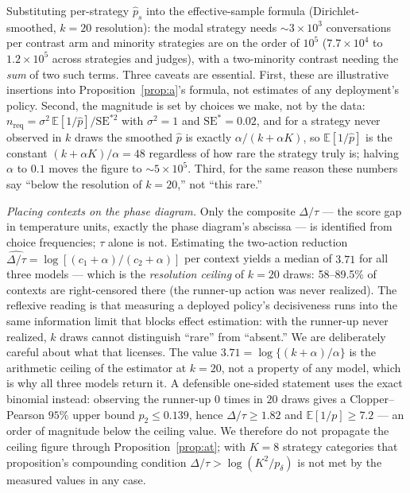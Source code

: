 \documentclass[11pt]{article}
\theoremstyle{definition}
\theoremstyle{remark}
\newcommand{\E}{\mathbb{E}}
\begin{document}
Substituting per-strategy $\hat{p}_s$ into the effective-sample formula
(Dirichlet-smoothed, $k = 20$ resolution): the modal strategy needs
${\sim}3\times 10^{3}$ conversations per contrast arm and minority
strategies are on the order of $10^{5}$ ($7.7\times10^{4}$ to
$1.2\times10^{5}$ across strategies and judges), with a two-minority
contrast needing the \emph{sum} of two such terms. Three caveats are
essential. First, these are illustrative insertions into
Proposition~\ref{prop:a}'s formula, not estimates of any deployment's
policy. Second, the magnitude is set by choices we make, not by the data:
$n_{\mathrm{req}} = \sigma^2\,\E[1/\hat p]/\mathrm{SE}^{*2}$ with
$\sigma^2 = 1$ and $\mathrm{SE}^{*} = 0.02$, and for a strategy never
observed in $k$ draws the smoothed $\hat p$ is exactly $\alpha/(k+\alpha K)$,
so $\E[1/\hat p]$ is the constant $(k + \alpha K)/\alpha = 48$ regardless of
how rare the strategy truly is; halving $\alpha$ to $0.1$ moves the figure
to ${\sim}5\times10^{5}$. Third, for the same reason these numbers say
``below the resolution of $k=20$,'' not ``this rare.''

\emph{Placing contexts on the phase diagram.} Only the composite
$\Delta/\tau$ --- the score gap in temperature units, exactly the phase
diagram's abscissa --- is identified from choice frequencies; $\tau$ alone is
not. Estimating the two-action reduction $\widehat{\Delta/\tau} =
\log[(c_1+\alpha)/(c_2+\alpha)]$ per context yields a median of $3.71$ for
all three models --- which is the \emph{resolution ceiling} of $k = 20$
draws: 58--89.5\% of contexts are right-censored there (the runner-up action
was never realized). The reflexive reading is that measuring a deployed policy's decisiveness
runs into the same information limit that blocks effect estimation: with the
runner-up never realized, $k$ draws cannot distinguish ``rare'' from
``absent.'' We are deliberately careful about what that licenses. The value
$3.71 = \log\{(k+\alpha)/\alpha\}$ is the arithmetic ceiling of the
estimator at $k=20$, not a property of any model, which is why all three
models return it. A defensible one-sided statement uses the exact binomial
instead: observing the runner-up $0$ times in $20$ draws gives a
Clopper--Pearson $95\%$ upper bound $p_2 \leq 0.139$, hence
$\Delta/\tau \geq 1.82$ and $\E[1/p] \geq 7.2$ --- an order of magnitude
below the ceiling value. We therefore do not propagate the ceiling figure
through Proposition~\ref{prop:at}; with $K = 8$ strategy categories that
proposition's compounding condition $\Delta/\tau > \log(K^2/p_\delta)$ is
not met by the measured values in any case.
\end{document}
